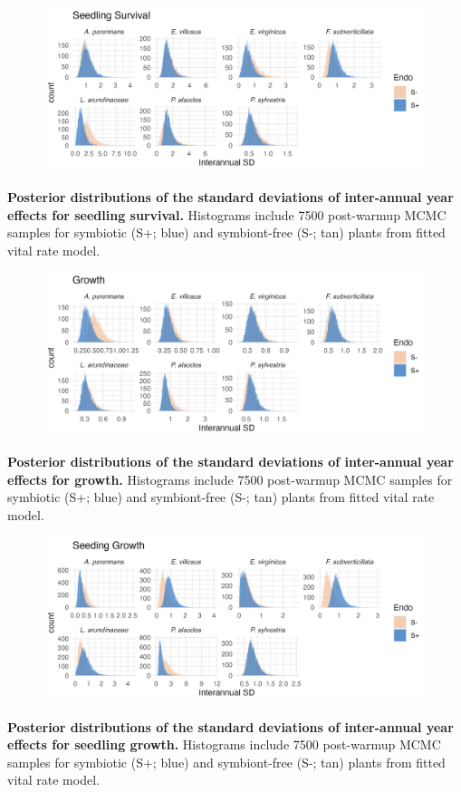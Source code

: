 \documentclass[12pt]{article}
\begin{document}
\begin{figure}[H]
	\centering
	\includegraphics[width=.9\linewidth]{seedsurv_sigmayear_hist.png}
\end{figure}
 \textbf{Posterior distributions of the standard deviations of inter-annual year effects for seedling survival.} Histograms include 7500 post-warmup MCMC samples for symbiotic (S+; blue) and symbiont-free (S-; tan) plants from fitted vital rate model.
\newpage

\begin{figure}[H]
	\centering
	\includegraphics[width=.9\linewidth]{grow_sigmayear_hist.png}
\end{figure}
 \textbf{Posterior distributions of the standard deviations of inter-annual year effects for growth.} Histograms include 7500 post-warmup MCMC samples for symbiotic (S+; blue) and symbiont-free (S-; tan) plants from fitted vital rate model.

\begin{figure}[H]
	\centering
	\includegraphics[width=.9\linewidth]{seedgrow_sigmayear_hist.png}
\end{figure}
 \textbf{Posterior distributions of the standard deviations of inter-annual year effects for seedling growth.} Histograms include 7500 post-warmup MCMC samples for symbiotic (S+; blue) and symbiont-free (S-; tan) plants from fitted vital rate model.
\newpage
\end{document}
